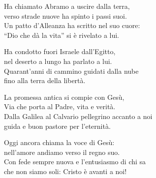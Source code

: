 

\spazio

\strofa Ha chiamato Abramo a uscire dalla terra,\\ 
verso strade nuove ha spinto i passi suoi.\\
Un patto d'Alleanza ha scritto nel suo cuore:\\ 
``Dio che dà la vita'' si è rivelato a lui.

\spazio


\spazio

\strofa Ha condotto fuori Israele dall'Egitto,\\
nel deserto a lungo ha parlato a lui.\\
Quarant'anni di cammino guidati dalla nube\\
fino alla terra della libertà.

\spazio


\spazio

\strofa La promessa antica si compie con Gesù,\\
Via che porta al Padre, vita e verità.\\
Dalla Galilea al Calvario pellegrino accanto a noi\\
guida e buon pastore per l'eternità.

\spazio


\spazio

\strofa Oggi ancora chiama la voce di Gesù:\\
nell'amore andiamo verso il regno suo.\\
Con fede sempre nuova e l'entusiasmo di chi sa\\
che non siamo soli: Cristo è avanti a noi!

\spazio

